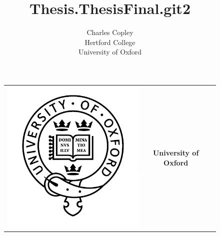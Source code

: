 \documentclass[english,a4paper,titlepage,12pt]{report}
\author{Charles Copley\\Hertford College\\University of Oxford}
\title{Thesis.ThesisFinal.git2}
\begin{document}
%
\pagestyle{empty}
\begin{center}

\begin{figure}[ht]
\centering
\begin{tabular}{ccc}
\begin{minipage}{3cm}
\includegraphics[scale=0.25]{./images/logos/OxfordLogo.png}
\end{minipage}
&
\begin{minipage}{9cm}
\centering
\textbf{\large University of Oxford}
\vspace{1 cm}


\end{minipage}
\end{tabular}
\end{figure}
\end{center}
\end{document}
